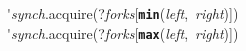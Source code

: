 \'\>\textit{synch}.acquire(?\textit{forks}[\texttt{\textbf{min}}(\textit{left},~\textit{right})])\\

\'\>\textit{synch}.acquire(?\textit{forks}[\texttt{\textbf{max}}(\textit{left},~\textit{right})])